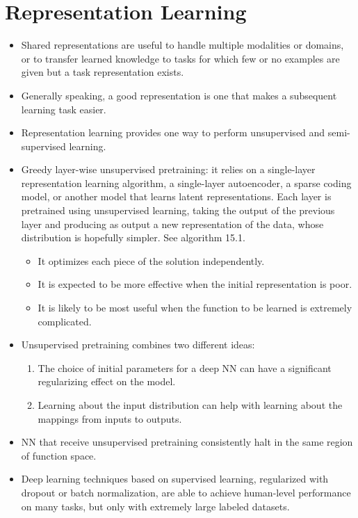 \documentclass{article}
\begin{document}
\section{Representation Learning}
\begin{itemize}
\item Shared representations are useful to handle multiple modalities or domains, or to transfer learned knowledge to tasks for which few or no examples are given but a task representation exists.
\item Generally speaking, a good representation is one that makes a subsequent learning task easier.
\item Representation learning provides one way to perform unsupervised and semi-supervised learning.
\item Greedy layer-wise unsupervised pretraining: it relies on a single-layer representation learning algorithm, a single-layer autoencoder, a sparse coding model, or another model that learns latent representations. Each layer is pretrained using unsupervised learning, taking the output of the previous layer and producing as output a new representation of the data, whose distribution is hopefully simpler. See algorithm 15.1.
\begin{itemize}
\item It optimizes each piece of the solution independently.
\item It is expected to be more effective when the initial representation is poor.
\item It is likely to be most useful when the function to be learned is extremely complicated.
\end{itemize}
\item Unsupervised pretraining combines two different ideas:
\begin{enumerate}
\item The choice of initial parameters for a deep NN can have a significant regularizing effect on the model.
\item Learning about the input distribution can help with learning about the mappings from inputs to outputs.
\end{enumerate}
\item NN that receive unsupervised pretraining consistently halt in the same region of function space.
\item Deep learning techniques based on supervised learning, regularized with dropout or batch normalization, are able to achieve human-level performance on many tasks, but only with extremely large labeled datasets.

\end{itemize}
\end{document}
